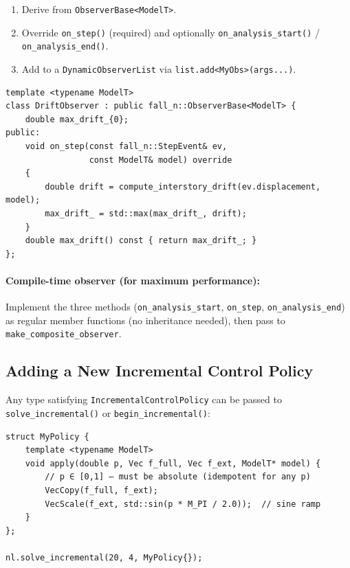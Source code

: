 \begin{enumerate}[nosep]
  \item Derive from \texttt{ObserverBase<ModelT>}.
  \item Override \texttt{on\_step()} (required) and optionally
        \texttt{on\_analysis\_start()} / \texttt{on\_analysis\_end()}.
  \item Add to a \texttt{DynamicObserverList} via \texttt{list.add<MyObs>(args...)}.
\end{enumerate}

\begin{verbatim}
template <typename ModelT>
class DriftObserver : public fall_n::ObserverBase<ModelT> {
    double max_drift_{0};
public:
    void on_step(const fall_n::StepEvent& ev,
                 const ModelT& model) override
    {
        double drift = compute_interstory_drift(ev.displacement, model);
        max_drift_ = std::max(max_drift_, drift);
    }
    double max_drift() const { return max_drift_; }
};
\end{verbatim}

\paragraph{Compile-time observer (for maximum performance):}

Implement the three methods (\texttt{on\_analysis\_start},
\texttt{on\_step}, \texttt{on\_analysis\_end}) as regular member functions
(no inheritance needed), then pass to \texttt{make\_composite\_observer}.


\subsection{Adding a New Incremental Control Policy}
\label{sec:arch:ext:control}

Any type satisfying \texttt{IncrementalControlPolicy} can be passed
to \texttt{solve\_incremental()} or \texttt{begin\_incremental()}:

\begin{verbatim}
struct MyPolicy {
    template <typename ModelT>
    void apply(double p, Vec f_full, Vec f_ext, ModelT* model) {
        // p ∈ [0,1] — must be absolute (idempotent for any p)
        VecCopy(f_full, f_ext);
        VecScale(f_ext, std::sin(p * M_PI / 2.0));  // sine ramp
    }
};

nl.solve_incremental(20, 4, MyPolicy{});
\end{verbatim}

